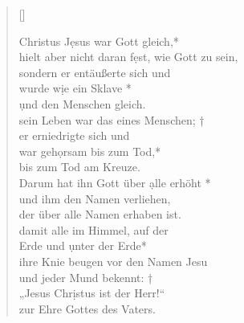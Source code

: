 

\begin{verse}[\versewidth]


Christus J\d esus war Gott gleich,*\\
hielt aber nicht daran f\d est, wie Gott zu sein,\\
\vin sondern er entäußerte sich und \\ \vin wurde w\d ie ein Sklave *\\
\vin \d und den Menschen gleich. \\
sein Leben war das eines Menschen; †\\
er erniedrigte sich und \\war geh\d orsam bis zum Tod,* \\
bis zum Tod am Kreuze.\\
\vin Darum hat ihn Gott über \d alle erhöht *\\
\vin und ihm den Namen verliehen, \\
\vin der über alle Namen erhaben ist.\\
damit alle im Himmel, auf der \\Erde und \d unter der Erde*\\
ihre Knie beugen vor den Namen Jesu\\
\vin und jeder Mund bekennt: †\\
\vin „Jesus Chr\d istus ist der Herr!“\\
\vin zur Ehre Gottes des Vaters.\\	

\end{verse}


\vspace{0.3cm}



\resp


\vspace{0.6cm}




\def\greinitialformat#1{{\fontsize{45}{45}\selectfont #1}}

\vspace{0.3cm}



\vspace{0.3cm}



\def\greinitialformat#1{{\fontsize{40}{40}\selectfont #1}}
\gresetfirstlineaboveinitial{\small \textcolor{red}{Magni.}}{}
\setaboveinitialseparation{0.72mm}



\newpage